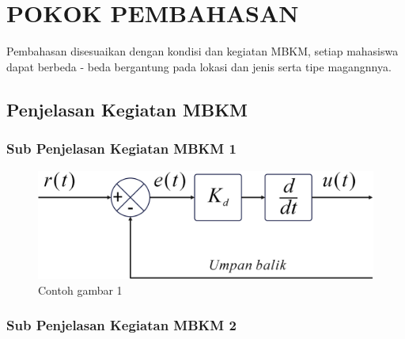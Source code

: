 \chapter[POKOK PEMBAHASAN]{\\ POKOK PEMBAHASAN}
Pembahasan disesuaikan dengan kondisi dan kegiatan MBKM, setiap mahasiswa dapat berbeda - beda bergantung pada lokasi dan jenis serta tipe magangnnya.

\lipsum[1]


\section{Penjelasan Kegiatan MBKM}
\lipsum[1]

\subsection{Sub Penjelasan Kegiatan MBKM 1}
\lipsum[1]

\begin{figure}[H]
    \centering
    \includegraphics[width=0.8\linewidth]{gambar/diagram.png}
    \caption{Contoh gambar 1}
    \label{gambar1}
\end{figure}

\lipsum[1]

\subsection{Sub Penjelasan Kegiatan MBKM 2}
\lipsum[1]

